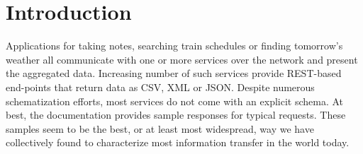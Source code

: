 \documentclass[10pt,preprint,blind,clearpagebib]{sigplanconf}
\begin{document}
%
%

\section{Introduction}
\label{sec:introduction}

Applications for taking notes, searching train schedules or finding tomorrow's weather all 
communicate with one or more services over the network and present the aggregated data. 
Increasing number of such services provide REST-based end-points that return data as CSV, XML
or JSON. Despite numerous schematization efforts, most services do not come with an 
explicit schema. At best, the documentation provides sample responses for typical requests.
These samples seem to be the best, or at least most widespread, way we have collectively found to 
characterize most information transfer in the world today.
\end{document}
